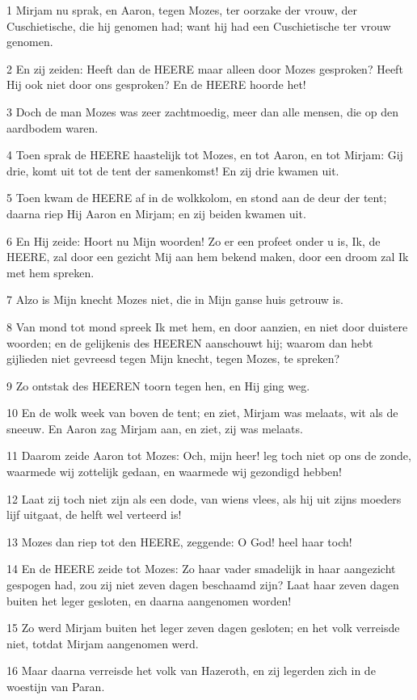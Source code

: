 \par 1 Mirjam nu sprak, en Aaron, tegen Mozes, ter oorzake der vrouw, der Cuschietische, die hij genomen had; want hij had een Cuschietische ter vrouw genomen.
\par 2 En zij zeiden: Heeft dan de HEERE maar alleen door Mozes gesproken? Heeft Hij ook niet door ons gesproken? En de HEERE hoorde het!
\par 3 Doch de man Mozes was zeer zachtmoedig, meer dan alle mensen, die op den aardbodem waren.
\par 4 Toen sprak de HEERE haastelijk tot Mozes, en tot Aaron, en tot Mirjam: Gij drie, komt uit tot de tent der samenkomst! En zij drie kwamen uit.
\par 5 Toen kwam de HEERE af in de wolkkolom, en stond aan de deur der tent; daarna riep Hij Aaron en Mirjam; en zij beiden kwamen uit.
\par 6 En Hij zeide: Hoort nu Mijn woorden! Zo er een profeet onder u is, Ik, de HEERE, zal door een gezicht Mij aan hem bekend maken, door een droom zal Ik met hem spreken.
\par 7 Alzo is Mijn knecht Mozes niet, die in Mijn ganse huis getrouw is.
\par 8 Van mond tot mond spreek Ik met hem, en door aanzien, en niet door duistere woorden; en de gelijkenis des HEEREN aanschouwt hij; waarom dan hebt gijlieden niet gevreesd tegen Mijn knecht, tegen Mozes, te spreken?
\par 9 Zo ontstak des HEEREN toorn tegen hen, en Hij ging weg.
\par 10 En de wolk week van boven de tent; en ziet, Mirjam was melaats, wit als de sneeuw. En Aaron zag Mirjam aan, en ziet, zij was melaats.
\par 11 Daarom zeide Aaron tot Mozes: Och, mijn heer! leg toch niet op ons de zonde, waarmede wij zottelijk gedaan, en waarmede wij gezondigd hebben!
\par 12 Laat zij toch niet zijn als een dode, van wiens vlees, als hij uit zijns moeders lijf uitgaat, de helft wel verteerd is!
\par 13 Mozes dan riep tot den HEERE, zeggende: O God! heel haar toch!
\par 14 En de HEERE zeide tot Mozes: Zo haar vader smadelijk in haar aangezicht gespogen had, zou zij niet zeven dagen beschaamd zijn? Laat haar zeven dagen buiten het leger gesloten, en daarna aangenomen worden!
\par 15 Zo werd Mirjam buiten het leger zeven dagen gesloten; en het volk verreisde niet, totdat Mirjam aangenomen werd.
\par 16 Maar daarna verreisde het volk van Hazeroth, en zij legerden zich in de woestijn van Paran.

